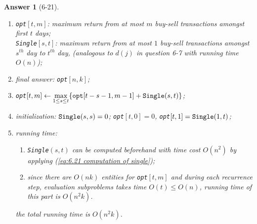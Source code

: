 \documentclass[11pt]{article}
\theoremstyle{numberplain}
\theoremstyle{nonumberplain}
\newtheorem{ans}{Answer}
\newcommand{\dps}{\displaystyle}
\newcommand{\0}{{\mathbf{0}}}
\begin{document}
\begin{ans}[6-21]
\begin{enumerate}
\item {\tt opt}$[t,m]$: maximum return from at most $m$ buy-sell transactions amongst first $t$ days; \\
{\tt Single}$[s,t]$: maximum return from at most $1$ buy-sell transactions amongst $s^{th}$ day to $t^{th}$ day, (analogous to $d(j)$ in question 6-7 with running time $O(n)$);
\item final answer: {\tt opt}$[n,k]$;
\item {\tt opt}$\dps [t,m]\leftarrow \max_{1\leq s\leq t}\{{\tt opt}[t-s-1,m-1]+{\tt Single}(s,t)\}$;
\item initialization:
 ${\tt Single}(s,s)=0$; {\tt opt}$[t,0]=0$, {\tt opt}$[t,1]={\tt Single}(1,t)$;
\item running time: 
\begin{enumerate}
\item {\tt Single}$(s,t)$ can be computed beforehand with time cost $O(n^2)$ by applying (\ref{eq:6.21 computation of single});
\item since there are $O(nk)$ entities for {\tt opt}$[t,m]$ and during each recurrence step, evaluation subproblems takes time $O(t)\leq O(n)$, running time of this part is $O(n^2k)$.
\end{enumerate}
the total running time is $O(n^2k)$.
\end{enumerate}
\end{ans}
\end{document}
